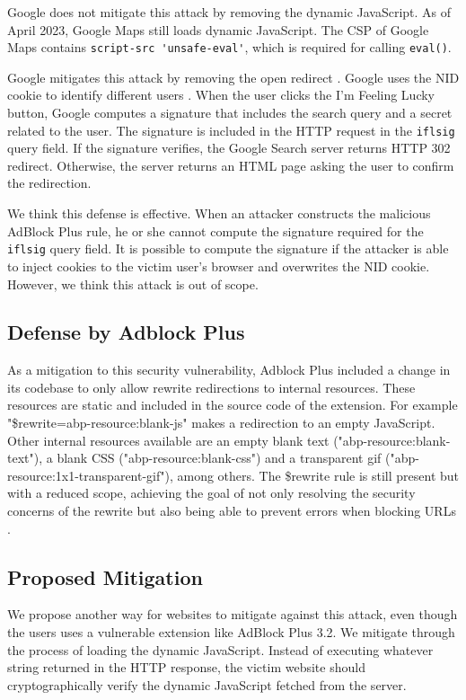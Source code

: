 \documentclass[conference]{IEEEtran}
\begin{document}
Google does not mitigate this attack by removing the dynamic JavaScript. As of April 2023, Google Maps still loads dynamic JavaScript. The CSP of Google Maps contains \lstinline{script-src 'unsafe-eval'}, which is required for calling \lstinline{eval()}.

Google mitigates this attack by removing the open redirect \cite{superuser_ifl_redir_notice}. Google uses the NID cookie to identify different users \cite{google_cookies}. When the user clicks the I'm Feeling Lucky button, Google computes a signature that includes the search query and a secret related to the user. The signature is included in the HTTP request in the \lstinline{iflsig} query field. If the signature verifies, the Google Search server returns HTTP 302 redirect. Otherwise, the server returns an HTML page asking the user to confirm the redirection.

We think this defense is effective. When an attacker constructs the malicious AdBlock Plus rule, he or she cannot compute the signature required for the \lstinline{iflsig} query field. It is possible to compute the signature if the attacker is able to inject cookies to the victim user's browser and overwrites the NID cookie. However, we think this attack is out of scope.

\subsection{Defense by Adblock Plus}
As a mitigation to this security vulnerability, Adblock Plus included a change in its codebase to only allow rewrite redirections to internal resources. These resources are static and included in the source code of the extension. For example "\$rewrite=abp-resource:blank-js" makes a redirection to an empty JavaScript. Other internal resources available are an empty blank text ("abp-resource:blank-text"), a blank CSS ("abp-resource:blank-css") and a transparent gif ("abp-resource:1x1-transparent-gif"), among others. The \$rewrite rule is still present but with a reduced scope, achieving the goal of not only resolving the security concerns of the rewrite but also being able to prevent errors when blocking URLs \cite{abp_filter_guide}. 
    
\subsection{Proposed Mitigation}

We propose another way for websites to mitigate against this attack, even though the users uses a vulnerable extension like AdBlock Plus 3.2. We mitigate through the process of loading the dynamic JavaScript. Instead of executing whatever string returned in the HTTP response, the victim website should cryptographically verify the dynamic JavaScript fetched from the server.
\end{document}
